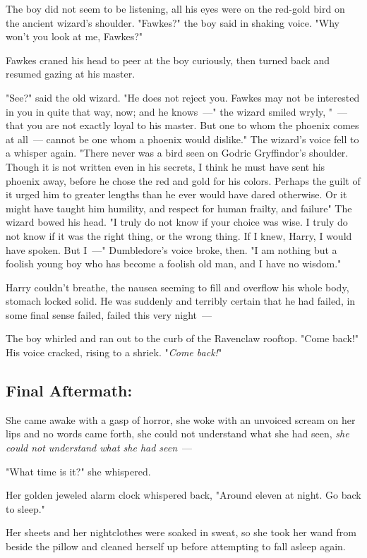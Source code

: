 The boy did not seem to be listening, all his eyes were on the red-gold bird on
the ancient wizard's shoulder. "Fawkes?" the boy said in shaking voice. "Why
won't you look at me, Fawkes?"

Fawkes craned his head to peer at the boy curiously, then turned back and
resumed gazing at his master.

"See?" said the old wizard. "He does not reject you. Fawkes may not be
interested in you in quite that way, now; and he knows~---" the wizard smiled
wryly, "~--- that you are not exactly loyal to his master. But one to whom the
phoenix comes at all~--- cannot be one whom a phoenix would dislike." The
wizard's voice fell to a whisper again. "There never was a bird seen on Godric
Gryffindor's shoulder. Though it is not written even in his secrets, I think he
must have sent his phoenix away, before he chose the red and gold for his
colors. Perhaps the guilt of it urged him to greater lengths than he ever would
have dared otherwise. Or it might have taught him humility, and respect for
human frailty, and failure{\el}" The wizard bowed his head. "I truly do not
know if your choice was wise. I truly do not know if it was the right thing, or
the wrong thing. If I knew, Harry, I would have spoken. But I~---" Dumbledore's
voice broke, then. "I am nothing but a foolish young boy who has become a
foolish old man, and I have no wisdom."

Harry couldn't breathe, the nausea seeming to fill and overflow his whole body,
stomach locked solid. He was suddenly and terribly certain that he had failed,
in some final sense failed, failed this very night~---

The boy whirled and ran out to the curb of the Ravenclaw rooftop. "Come back!"
His voice cracked, rising to a shriek. "\emph{Come back!}"
\sbreak
\subsection{Final Aftermath:}

She came awake with a gasp of horror, she woke with an unvoiced scream on her
lips and no words came forth, she could not understand what she had seen,
\emph{she could not understand what she had seen}~---

"What time is it?" she whispered.

Her golden jeweled alarm clock whispered back, "Around eleven at night. Go back
to sleep."

Her sheets and her nightclothes were soaked in sweat, so she took her
wand from beside the pillow and cleaned herself up before attempting
to fall asleep again.

